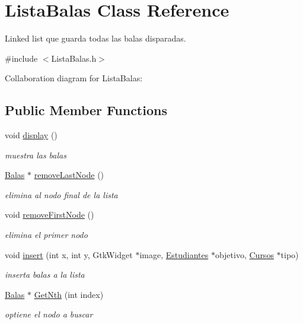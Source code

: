 \hypertarget{classListaBalas}{}\section{Lista\+Balas Class Reference}
\label{classListaBalas}


Linked list que guarda todas las balas disparadas.  




{\ttfamily \#include $<$Lista\+Balas.\+h$>$}



Collaboration diagram for Lista\+Balas\+:
\subsection*{Public Member Functions}
\begin{DoxyCompactItemize}
\item 
void \hyperlink{classListaBalas_a5ce452a7adfbe4e734239579e30a50e2}{display} ()
\begin{DoxyCompactList}\small\item\em muestra las balas \end{DoxyCompactList}\item 
\hyperlink{classBalas}{Balas} $\ast$ \hyperlink{classListaBalas_ae38baa10f7be51f76e7b6e44e0e3a4e2}{remove\+Last\+Node} ()
\begin{DoxyCompactList}\small\item\em elimina al nodo final de la lista \end{DoxyCompactList}\item 
void \hyperlink{classListaBalas_a83897d7c69207e879a0d5c8da98f2573}{remove\+First\+Node} ()
\begin{DoxyCompactList}\small\item\em elimina el primer nodo \end{DoxyCompactList}\item 
void \hyperlink{classListaBalas_a5ba03ff5277361dcf0f17d44e644fb9d}{insert} (int x, int y, Gtk\+Widget $\ast$image, \hyperlink{classEstudiantes}{Estudiantes} $\ast$objetivo, \hyperlink{classCursos}{Cursos} $\ast$tipo)
\begin{DoxyCompactList}\small\item\em inserta balas a la lista \end{DoxyCompactList}\item 
\hyperlink{classBalas}{Balas} $\ast$ \hyperlink{classListaBalas_ad04cd8b77e658ad2d4cfd8bcccd45411}{Get\+Nth} (int index)
\begin{DoxyCompactList}\small\item\em optiene el nodo a buscar \end{DoxyCompactList}\item 

\end{DoxyCompactItemize}
